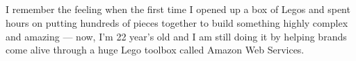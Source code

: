 \documentclass[9pt]{developercv} %
\begin{document}
\begin{minipage}[t]{0.375\textwidth} %
	\vspace{-\baselineskip} %
	\begin{addmargin}[1.29cm]{0cm}
		
		\\
		\\
		\\	
		\\
				
	\end{addmargin}
\end{minipage}


\vspace{0.5cm}



\begin{minipage}[t]{0.4\textwidth} %
	\vspace{-\baselineskip} %
		
	I remember the feeling when the first time I opened up a box of Legos and spent hours on putting hundreds of pieces together to build something highly complex and amazing  — now, I'm 22 year's old and I am still doing it by helping brands come alive through a huge Lego toolbox called Amazon Web Services.
		
\end{minipage}
\hfill %
\begin{minipage}[t]{0.5\textwidth} %
	\vspace{-\baselineskip} %
	\begin{barchart}{5.5}
	\end{barchart}
\end{minipage}
\end{document}
